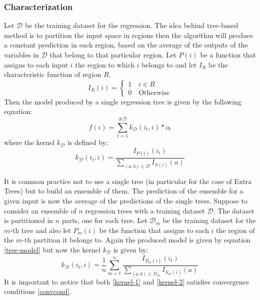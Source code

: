 		\subsubsection{Characterization}
			\noindent Let $\mathcal{D}$ be the training dataset for the regression. The idea behind tree-based method is to partition the input
			space in regions then the algorithm will produce a constant prediction in each region, based on the average of the outputs of the
			variables in $\mathcal{D}$ that belong to that particular region.\newline
			Let $P(i)$ be a function that assigns to each input $i$ the region to which $i$ belongs to and let $I_R$ be the characteristic function of
			region $R$.
			\begin{equation}
				I_R(i) =
				\begin{cases}
					1 \quad i \in R \\
					0 \quad \text{Otherwise}
				\end{cases}
			\end{equation}
			Then the model produced by a single regression tree is given by the following equation:
			\begin{equation}
				f(i) = \sum_{t=1}^{\#\mathcal{D}} k_{\mathcal{D}} (i_t,i)*o_t
				\label{tree-model}
			\end{equation}
			where the kernel $k_{\mathcal{D}}$ is defined by:
			\begin{equation}
				k_{\mathcal{D}}(i_t, i) = \frac{I_{P(i)}(i_t)}{\sum_{(a,b) \in \mathcal{D}} I_{S(i)}(a)}
				\label{kernel-1}
			\end{equation}

			\noindent It is common practice not to use a single tree (in particular for the case of Extra Trees) but to build an ensemble of them.
			The prediction of the ensemble for a given input is now the average of the predictions of the single trees.\newline
			Suppose to consider an ensemble of $n$ regression trees with a training dataset $\mathcal{D}$. The dataset is partitioned in $n$ parts,
			one for each tree. Let $\mathcal{D}_m$ be the training dataset for the $m$-th tree and also let $P_{m}(i)$ be the function that
			assigns to each $i$ the region of the $m$-th partition it belongs to. Again the produced model is given by equation \ref{tree-model} but
			now the kernel $k_{\mathcal{D}}$ is given by:
			\begin{equation}
				k_{\mathcal{D}}(i_t, i) = \frac{1}{n} \sum_{m=1}^{n} \frac{I_{P_{m}(i)}(i_t)}{\sum_{(a,b) \in \mathcal{D}_m} I_{S_{m}(i)}(a)}
				\label{kernel-2}
			\end{equation}
			\noindent It is important to notice that both \ref{kernel-1} and \ref{kernel-2} satisfies convergence conditions \ref{convcond}.\newline

